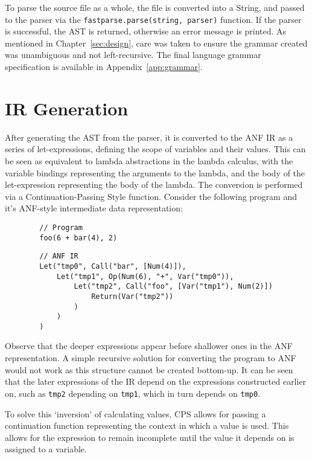 To parse the source file as a whole, the file is converted into a String, and passed to the parser
via the \texttt{fastparse.parse(string, parser)} function. If the parser is successful,
the AST is returned, otherwise an error message is printed. As mentioned in
Chapter~\ref{sec:design}, care was taken to ensure the grammar created was unambiguous and not
left-recursive. The final language grammar specification is available in Appendix~\ref{app:grammar}.

\section{IR Generation}

After generating the AST from the parser, it is converted to the ANF IR as a series of
let-expressions, defining the scope of variables and their values. This can be seen as equivalent to
lambda abstractions in the lambda calculus, with the variable bindings representing the arguments to
the lambda, and the body of the let-expression representing the body of the lambda. The conversion
is performed via a Continuation-Passing Style function. Consider the following program and it's
ANF-style intermediate data representation:

\begin{tcolorbox}
    \begin{verbatim}
        // Program
        foo(6 + bar(4), 2)
    \end{verbatim}
    \tcblower
    \begin{verbatim}
        // ANF IR
        Let("tmp0", Call("bar", [Num(4)]),
            Let("tmp1", Op(Num(6), "+", Var("tmp0")),
                Let("tmp2", Call("foo", [Var("tmp1"), Num(2)])
                    Return(Var("tmp2"))
                )
            )
        )
    \end{verbatim}
\end{tcolorbox}

Observe that the deeper expressions appear before shallower ones in the ANF
representation. A simple recursive solution for converting the program to ANF would not work as this
structure cannot be created bottom-up. It can be seen that the later expressions of the IR depend on
the expressions constructed earlier on, such as \texttt{tmp2} depending on \texttt{tmp1}, which in
turn depends on \texttt{tmp0}.

To solve this `inversion' of calculating values, CPS allows for passing a continuation function
representing the context in which a value is used. This allows for the expression to remain
incomplete until the value it depends on is assigned to a variable.

